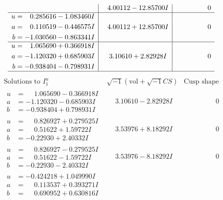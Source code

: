 \documentclass[1p]{elsarticle_modified}
\theoremstyle{definition}
\newcommand{\I}{\sqrt{-1}}
\begin{document}
$$\begin{array}{c|c|c}
 & \phantom{-}4.00112 - 12.85700 I & \phantom{-0.000000 } 0 \\ \hline\begin{aligned}
u &= \phantom{-}0.285616 - 1.083460 I \\
a &= \phantom{-}0.110519 - 0.446575 I \\
b &= -1.030560 - 0.863341 I\end{aligned}
 & \phantom{-}4.00112 + 12.85700 I & \phantom{-0.000000 } 0 \\ \hline\begin{aligned}
u &= \phantom{-}1.065690 + 0.366918 I \\
a &= -1.120320 + 0.685903 I \\
b &= -0.938404 - 0.798931 I\end{aligned}
 & \phantom{-}3.10610 + 2.82928 I & \phantom{-0.000000 } 0\\
 \hline 
 \end{array}$$\newpage$$\begin{array}{c|c|c}  
\text{Solutions to }I^u_{1}& \I (\text{vol} + \sqrt{-1}CS) & \text{Cusp shape}\\
 \hline 
\begin{aligned}
u &= \phantom{-}1.065690 - 0.366918 I \\
a &= -1.120320 - 0.685903 I \\
b &= -0.938404 + 0.798931 I\end{aligned}
 & \phantom{-}3.10610 - 2.82928 I & \phantom{-0.000000 } 0 \\ \hline\begin{aligned}
u &= \phantom{-}0.826927 + 0.279525 I \\
a &= \phantom{-}0.51622 + 1.59722 I \\
b &= -0.22930 + 2.40332 I\end{aligned}
 & \phantom{-}3.53976 + 8.18292 I & \phantom{-0.000000 } 0 \\ \hline\begin{aligned}
u &= \phantom{-}0.826927 - 0.279525 I \\
a &= \phantom{-}0.51622 - 1.59722 I \\
b &= -0.22930 - 2.40332 I\end{aligned}
 & \phantom{-}3.53976 - 8.18292 I & \phantom{-0.000000 } 0 \\ \hline\begin{aligned}
u &= -0.424218 + 1.049990 I \\
a &= \phantom{-}0.113537 + 0.393271 I \\
b &= \phantom{-}0.690952 + 0.630816 I\end{aligned}

\end{array}$$
\end{document}

